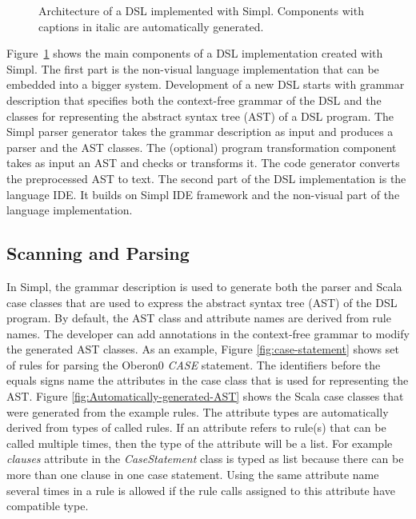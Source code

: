 %
\begin{figure}[!h]
\begin{centering}
\par\end{centering}

\caption{\label{fig:architecture}Architecture of a DSL implemented with Simpl.
Components with captions in italic are automatically generated.}

\end{figure}


Figure~\ref{fig:architecture} shows the main components of a DSL
implementation created with Simpl. The first part is the non-visual
language implementation that can be embedded into a bigger system.
Development of a new DSL starts with grammar description that specifies
both the context-free grammar of the DSL and the classes for representing
the abstract syntax tree (AST) of a DSL program. The Simpl parser
generator takes the grammar description as input and produces a parser
and the AST classes. The (optional) program transformation component
takes as input an AST and checks or transforms it. The code generator
converts the preprocessed AST to text. The second part of the DSL
implementation is the language IDE. It builds on Simpl IDE framework
and the non-visual part of the language implementation.


\subsection{Scanning and Parsing}

In Simpl, the grammar description is used to generate both the parser
and Scala case classes that are used to express the abstract syntax
tree (AST) of the DSL program. By default, the AST class and attribute
names are derived from rule names. The developer can add annotations
in the context-free grammar to modify the generated AST classes. As
an example, Figure \ref{fig:case-statement} shows set of rules for
parsing the Oberon0 \emph{CASE} statement. The identifiers before
the equals signs name the attributes in the case class that is used
for representing the AST. Figure \ref{fig:Automatically-generated-AST}
shows the Scala case classes that were generated from the example
rules. The attribute types are automatically derived from types of
called rules. If an attribute refers to rule(s) that can be called
multiple times, then the type of the attribute will be a list. For
example \emph{clauses} attribute in the \emph{CaseStatement} class
is typed as list because there can be more than one clause in one
case statement. Using the same attribute name several times in a rule
is allowed if the rule calls assigned to this attribute have compatible
type.

